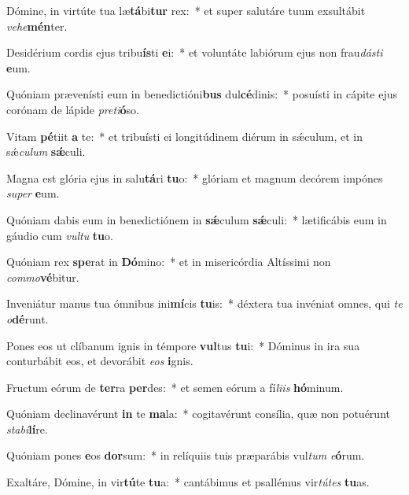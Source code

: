 \item Dómine, in virtúte tua læ\textbf{tá}bi\textbf{tur} rex:~* et super salutáre tuum exsultábit \textit{ve}\textit{he}\textbf{mén}ter.
\item Desidérium cordis ejus tribu\textbf{ís}ti \textbf{e}i:~* et voluntáte labiórum ejus non frau\textit{dás}\textit{ti} \textbf{e}um.
\item Quóniam prævenísti eum in benedictióni\textbf{bus} dul\textbf{cé}dinis:~* posuísti in cápite ejus corónam de lápide \textit{pre}\textit{ti}\textbf{ó}so.
\item Vitam \textbf{pé}tiit \textbf{a} te:~* et tribuísti ei longitúdinem diérum in sǽculum, et in sǽ\textit{cu}\textit{lum} \textbf{sǽ}culi.
\item Magna est glória ejus in salu\textbf{tá}ri \textbf{tu}o:~* glóriam et magnum decórem impónes \textit{su}\textit{per} \textbf{e}um.
\item Quóniam dabis eum in benedictiónem in \textbf{sǽ}culum \textbf{sǽ}culi:~* lætificábis eum in gáudio cum \textit{vul}\textit{tu} \textbf{tu}o.
\item Quóniam rex \textbf{spe}rat in \textbf{Dó}mino:~* et in misericórdia Altíssimi non \textit{com}\textit{mo}\textbf{vé}bitur.
\item Inveniátur manus tua ómnibus ini\textbf{mí}cis \textbf{tu}is:~* déxtera tua invéniat omnes, qui \textit{te} \textit{o}\textbf{dé}runt.
\item Pones eos ut clíbanum ignis in témpore \textbf{vul}tus \textbf{tu}i:~* Dóminus in ira sua conturbábit eos, et devorábit \textit{e}\textit{os} \textbf{i}gnis.
\item Fructum eórum de \textbf{ter}ra \textbf{per}des:~* et semen eórum a fí\textit{li}\textit{is} \textbf{hó}minum.
\item Quóniam declinavérunt \textbf{in} te \textbf{ma}la:~* cogitavérunt consília, quæ non potuérunt \textit{sta}\textit{bi}\textbf{lí}re.
\item Quóniam pones \textbf{e}os \textbf{dor}sum:~* in relíquiis tuis præparábis vul\textit{tum} \textit{e}\textbf{ó}rum.
\item Exaltáre, Dómine, in vir\textbf{tú}te \textbf{tu}a:~* cantábimus et psallémus vir\textit{tú}\textit{tes} \textbf{tu}as.
